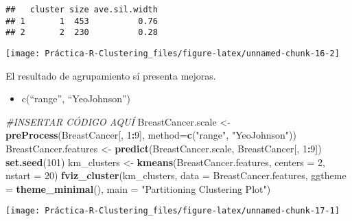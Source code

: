 \documentclass[]{article}
\newenvironment{Shaded}{\begin{snugshade}}{\end{snugshade}}
\newcommand{\CommentTok}[1]{\textcolor[rgb]{0.56,0.35,0.01}{\textit{#1}}}
\newcommand{\DataTypeTok}[1]{\textcolor[rgb]{0.13,0.29,0.53}{#1}}
\newcommand{\DecValTok}[1]{\textcolor[rgb]{0.00,0.00,0.81}{#1}}
\newcommand{\KeywordTok}[1]{\textcolor[rgb]{0.13,0.29,0.53}{\textbf{#1}}}
\newcommand{\NormalTok}[1]{#1}
\newcommand{\OperatorTok}[1]{\textcolor[rgb]{0.81,0.36,0.00}{\textbf{#1}}}
\newcommand{\StringTok}[1]{\textcolor[rgb]{0.31,0.60,0.02}{#1}}
\providecommand{\tightlist}{%
  \setlength{\itemsep}{0pt}\setlength{\parskip}{0pt}}
\begin{document}
\begin{verbatim}
##   cluster size ave.sil.width
## 1       1  453          0.76
## 2       2  230          0.28
\end{verbatim}

\begin{center}\texttt{[image: Práctica-R-Clustering\_files/figure-latex/unnamed-chunk-16-2]} \end{center}

El resultado de agrupamiento sí presenta mejoras.

\begin{itemize}
\tightlist
\item
  c(``range'', ``YeoJohnson'')
\end{itemize}

\begin{Shaded}
\begin{Highlighting}[]
\CommentTok{#INSERTAR CÓDIGO AQUÍ}
\NormalTok{BreastCancer.scale <-}\StringTok{ }\KeywordTok{preProcess}\NormalTok{(BreastCancer[, }\DecValTok{1}\OperatorTok{:}\DecValTok{9}\NormalTok{], }\DataTypeTok{method=}\KeywordTok{c}\NormalTok{(}\StringTok{"range"}\NormalTok{, }\StringTok{"YeoJohnson"}\NormalTok{))}
\NormalTok{BreastCancer.features <-}\StringTok{ }\KeywordTok{predict}\NormalTok{(BreastCancer.scale, BreastCancer[, }\DecValTok{1}\OperatorTok{:}\DecValTok{9}\NormalTok{])}
\KeywordTok{set.seed}\NormalTok{(}\DecValTok{101}\NormalTok{)}
\NormalTok{km_clusters <-}\StringTok{ }\KeywordTok{kmeans}\NormalTok{(BreastCancer.features, }\DataTypeTok{centers =} \DecValTok{2}\NormalTok{, }\DataTypeTok{nstart =} \DecValTok{20}\NormalTok{)}
\KeywordTok{fviz_cluster}\NormalTok{(km_clusters, }\DataTypeTok{data =}\NormalTok{ BreastCancer.features,}
             \DataTypeTok{ggtheme =} \KeywordTok{theme_minimal}\NormalTok{(),}
             \DataTypeTok{main =} \StringTok{"Partitioning Clustering Plot"}\NormalTok{)}
\end{Highlighting}
\end{Shaded}

\begin{center}\texttt{[image: Práctica-R-Clustering\_files/figure-latex/unnamed-chunk-17-1]} \end{center}

\begin{Shaded}
\end{Shaded}
\end{document}
